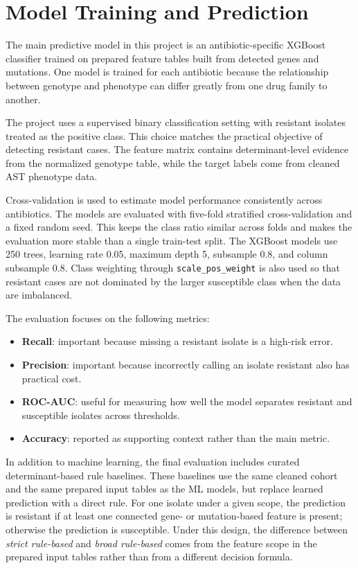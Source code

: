 \section{Model Training and Prediction}

The main predictive model in this project is an antibiotic-specific XGBoost classifier trained on prepared feature tables built from detected genes and mutations. One model is trained for each antibiotic because the relationship between genotype and phenotype can differ greatly from one drug family to another.

The project uses a supervised binary classification setting with resistant isolates treated as the positive class. This choice matches the practical objective of detecting resistant cases. The feature matrix contains determinant-level evidence from the normalized genotype table, while the target labels come from cleaned AST phenotype data.

Cross-validation is used to estimate model performance consistently across antibiotics. The models are evaluated with five-fold stratified cross-validation and a fixed random seed. This keeps the class ratio similar across folds and makes the evaluation more stable than a single train-test split. The XGBoost models use 250 trees, learning rate 0.05, maximum depth 5, subsample 0.8, and column subsample 0.8. Class weighting through \texttt{scale\_pos\_weight} is also used so that resistant cases are not dominated by the larger susceptible class when the data are imbalanced.

The evaluation focuses on the following metrics:

\begin{itemize}
    \item \textbf{Recall}: important because missing a resistant isolate is a high-risk error.
    \item \textbf{Precision}: important because incorrectly calling an isolate resistant also has practical cost.
    \item \textbf{ROC-AUC}: useful for measuring how well the model separates resistant and susceptible isolates across thresholds.
    \item \textbf{Accuracy}: reported as supporting context rather than the main metric.
\end{itemize}

In addition to machine learning, the final evaluation includes curated determinant-based rule baselines. These baselines use the same cleaned cohort and the same prepared input tables as the ML models, but replace learned prediction with a direct rule. For one isolate under a given scope, the prediction is resistant if at least one connected gene- or mutation-based feature is present; otherwise the prediction is susceptible. Under this design, the difference between \textit{strict rule-based} and \textit{broad rule-based} comes from the feature scope in the prepared input tables rather than from a different decision formula.

